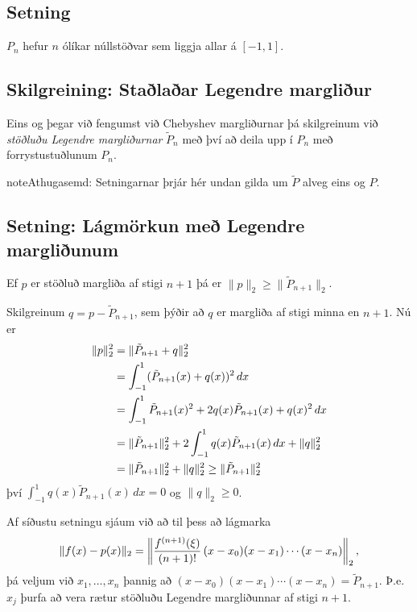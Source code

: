 \documentclass[A4paper,10pt,icelandic]{sphinxmanual}
\begin{document}
\subsection{Setning}
\label{kafli03:id6}
\(P_n\) hefur \(n\) ólíkar núllstöðvar sem liggja
allar á \([-1,1]\).


\subsection{Skilgreining: Staðlaðar Legendre margliður}
\label{kafli03:skilgreining-stalaar-legendre-margliur}
Eins og þegar við fengumst við Chebyshev margliðurnar þá skilgreinum við
\emph{stöðluðu Legendre margliðurnar} \(\tilde P_n\) með því að deila upp
í \(P_n\) með forrystustuðlunum \(P_n\).

\begin{notice}{note}{Athugasemd:}
Setningarnar þrjár hér undan gilda um \(\tilde P\) alveg eins og \(P\).
\end{notice}


\subsection{Setning: Lágmörkun með Legendre margliðunum}
\label{kafli03:setning-lagmorkun-me-legendre-margliunum}
Ef \(p\) er stöðluð margliða af stigi \(n+1\) þá er
\(\|p\|_2\geq \|\tilde P_{n+1}\|_2\).

Skilgreinum
\(q = p-\tilde P_{n+1}\), sem þýðir að \(q\) er margliða af
stigi minna en \(n+1\). Nú er
\begin{gather}
\begin{split}\begin{aligned}
   \|p\|_2^2 &= \|\tilde P_{n+1} + q\|_2^2 \\
   &= \int_{-1}^1 (\tilde P_{n+1}(x) + q(x))^2\, dx \\
   &= \int_{-1}^1 \tilde P_{n+1}(x)^2 + 2q(x)\tilde P_{n+1}(x) + q(x)^2\, dx\\
   &= \|\tilde P_{n+1}\|_2^2 + 2\int_{-1}^1 q(x)\tilde P_{n+1}(x)\, dx + \|q\|_2^2\\
   &= \|\tilde P_{n+1}\|_2^2 +  \|q\|_2^2 \geq \|\tilde P_{n+1}\|_2^2
  \end{aligned}\end{split}\notag
\end{gather}
því \(\int_{-1}^1 q(x)\tilde P_{n+1}(x)\, dx=0\) og
\(\|q\|_2 \geq 0\).

Af síðustu setningu sjáum við að til þess að lágmarka
\begin{gather}
\begin{split}\|f(x)-p(x)\|_2 = \left\|\frac{f^{(n+1)}(\xi)}{(n+1)!}\, (x-x_0)(x-x_1)\cdots (x-x_n) \right\|_2,\end{split}\notag
\end{gather}
þá veljum við \(x_1,\ldots,x_n\) þannig að
\((x-x_0)(x-x_1)\cdots (x-x_n) = \tilde P_{n+1}\).
Þ.e. \(x_j\) þurfa að vera rætur stöðluðu Legendre margliðunnar af
stigi \(n+1\).
\end{document}
